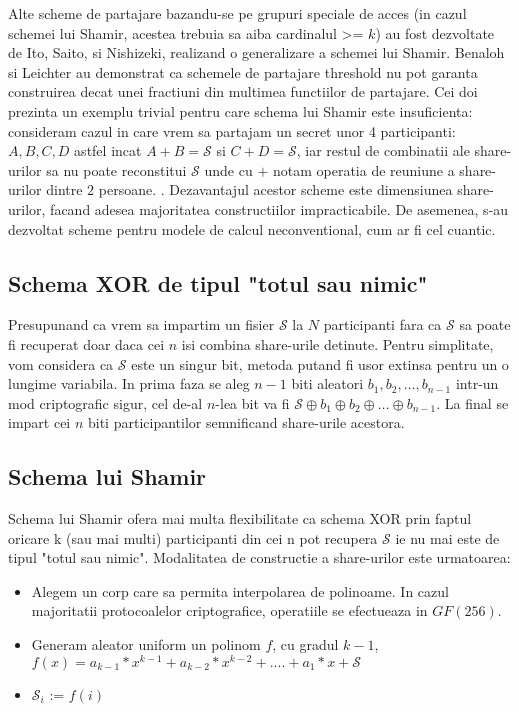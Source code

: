 \documentclass{llncs}
\begin{document}
Alte scheme de partajare bazandu-se pe grupuri speciale de acces (in cazul schemei lui Shamir, acestea trebuia sa aiba cardinalul >= $k$) au fost dezvoltate de Ito, Saito, si Nishizeki, realizand o generalizare a schemei lui Shamir. \cite{ITO:1989}
Benaloh si Leichter au demonstrat ca schemele de partajare threshold nu pot garanta construirea decat unei fractiuni din multimea functiilor de partajare. Cei doi prezinta un exemplu trivial pentru care schema lui Shamir este insuficienta: consideram cazul in care vrem sa partajam un secret unor 4 participanti: $A, B, C, D$ astfel incat $A + B = \mathcal{S}$ si $C + D = \mathcal{S}$, iar restul de combinatii ale share-urilor sa nu poate reconstitui $\mathcal{S}$ unde cu $+$ notam operatia de reuniune a share-urilor dintre $2$ persoane. \cite{JJ:1990}.
Dezavantajul acestor scheme este dimensiunea share-urilor, facand adesea majoritatea constructiilor impracticabile. \cite{Survey:2011}
De asemenea, s-au dezvoltat scheme pentru modele de calcul neconventional, cum ar fi cel cuantic. \cite{hillery:1999}

\subsection{Schema XOR de tipul "totul sau nimic"}


Presupunand ca vrem sa impartim un fisier $\mathcal{S}$ la $N$ participanti fara ca $\mathcal{S}$ sa poate fi recuperat doar daca cei $n$ isi combina share-urile detinute. Pentru simplitate, vom considera ca $\mathcal{S}$ este un singur bit, metoda putand fi usor extinsa pentru un o lungime variabila.
In prima faza se aleg $n - 1$ biti aleatori $b_1, b_2, \dots, b_{n - 1}$ intr-un mod criptografic sigur, cel de-al $n$-lea bit va fi $\mathcal{S} \oplus b_1 \oplus b_2 \oplus \dots \oplus b_{n - 1}$. La final se impart cei $n$ biti participantilor semnificand share-urile acestora.

\subsection{Schema lui Shamir}

Schema lui Shamir ofera mai multa flexibilitate ca schema XOR prin faptul oricare k (sau mai multi) participanti din cei n pot recupera $\mathcal{S}$ ie nu mai este de tipul "totul sau nimic". Modalitatea de constructie a share-urilor este urmatoarea: \cite{S:1979}
\begin{itemize}
	\item Alegem un corp care sa permita interpolarea de polinoame. In cazul majoritatii protocoalelor criptografice, operatiile se efectueaza in $GF(256)$.
	\item Generam aleator uniform un polinom $f$, cu gradul $k - 1$, $f(x) = a_{k-1} * x ^ {k-1} + a_{k-2} * x ^ {k - 2} + .... + a_1 * x + \mathcal{S}$
	\item $\mathcal{S}_i$ := $f(i)$
\end{itemize}
\end{document}
